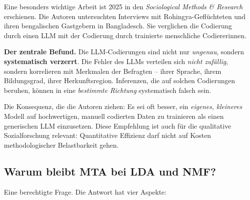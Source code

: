 \documentclass[a4paper,11pt]{article}
\begin{document}
Eine besonders wichtige Arbeit ist 2025 in den \emph{Sociological
Methods \& Research} erschienen. Die Autoren untersuchten Interviews
mit Rohingya-Geflüchteten und ihren bengalischen Gastgebern in
Bangladesch. Sie verglichen die Codierung durch einen LLM mit der
Codierung durch trainierte menschliche Codiererinnen.

\begin{merkbox}
\textbf{Der zentrale Befund.} Die LLM-Codierungen sind nicht nur
\emph{ungenau}, sondern \textbf{systematisch verzerrt}. Die Fehler
des LLMs verteilen sich \emph{nicht zufällig}, sondern korrelieren
mit Merkmalen der Befragten -- ihrer Sprache, ihrem Bildungsgrad,
ihrer Herkunftsregion. Inferenzen, die auf solchen Codierungen
beruhen, können in eine \emph{bestimmte Richtung} systematisch falsch
sein.
\end{merkbox}

Die Konsequenz, die die Autoren ziehen: Es sei oft besser, ein
\emph{eigenes, kleineres} Modell auf hochwertigen, manuell codierten
Daten zu trainieren als einen generischen LLM einzusetzen. Diese
Empfehlung ist auch für die qualitative Sozialforschung relevant:
Quantitative Effizienz darf nicht auf Kosten methodologischer
Belastbarkeit gehen.

\subsection{Warum bleibt MTA bei LDA und NMF?}

Eine berechtigte Frage. Die Antwort hat vier Aspekte:
\end{document}
